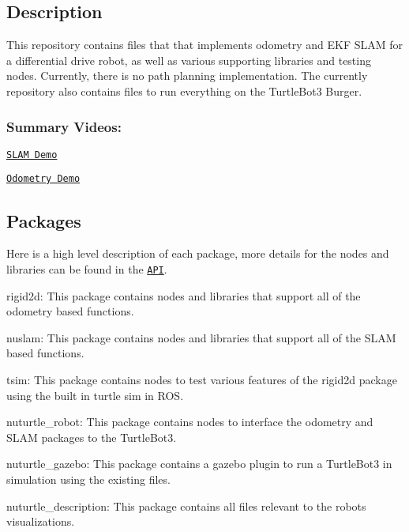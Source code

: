 \subsection*{Description}

This repository contains files that that implements odometry and E\+KF S\+L\+AM for a differential drive robot, as well as various supporting libraries and testing nodes. Currently, there is no path planning implementation. The currently repository also contains files to run everything on the Turtle\+Bot3 Burger.

\subsubsection*{Summary Videos\+:}


\begin{DoxyItemize}
\item \href{https://www.youtube.com/watch?v=SxR_UP2P1BQ}{\tt S\+L\+AM Demo}
\item \href{https://www.youtube.com/watch?v=V_Ljk7B5whE}{\tt Odometry Demo}
\end{DoxyItemize}

\subsection*{Packages}

Here is a high level description of each package, more details for the nodes and libraries can be found in the \href{https://rencheckyoself.github.io/turtlebot3-navigation/index.html}{\tt A\+PI}.


\begin{DoxyItemize}
\item {\ttfamily rigid2d}\+: This package contains nodes and libraries that support all of the odometry based functions.
\item {\ttfamily nuslam}\+: This package contains nodes and libraries that support all of the S\+L\+AM based functions.
\item {\ttfamily tsim}\+: This package contains nodes to test various features of the rigid2d package using the built in turtle sim in R\+OS.
\item {\ttfamily nuturtle\+\_\+robot}\+: This package contains nodes to interface the odometry and S\+L\+AM packages to the Turtle\+Bot3.
\item {\ttfamily nuturtle\+\_\+gazebo}\+: This package contains a gazebo plugin to run a Turtle\+Bot3 in simulation using the existing files.
\item {\ttfamily nuturtle\+\_\+description}\+: This package contains all files relevant to the robots visualizations.
\end{DoxyItemize}

